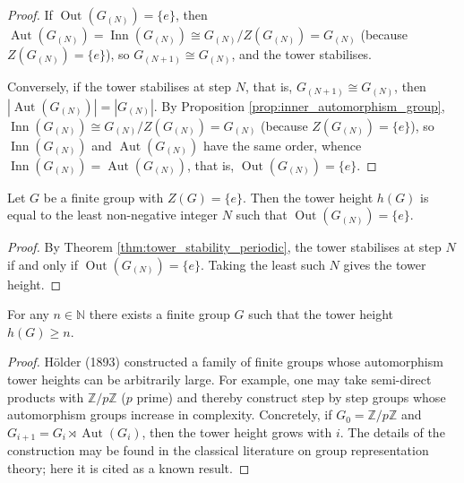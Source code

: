 \begin{proof}
If $\operatorname{Out}(G_{(N)}) = \{e\}$, then $\operatorname{Aut}(G_{(N)}) = \operatorname{Inn}(G_{(N)}) \cong G_{(N)}/Z(G_{(N)}) = G_{(N)}$ (because $Z(G_{(N)})=\{e\}$), so $G_{(N+1)} \cong G_{(N)}$, and the tower stabilises.

Conversely, if the tower stabilises at step $N$, that is, $G_{(N+1)} \cong G_{(N)}$, then $|\operatorname{Aut}(G_{(N)})| = |G_{(N)}|$. By Proposition \ref{prop:inner_automorphism_group}, $\operatorname{Inn}(G_{(N)}) \cong G_{(N)}/Z(G_{(N)}) = G_{(N)}$ (because $Z(G_{(N)})=\{e\}$), so $\operatorname{Inn}(G_{(N)})$ and $\operatorname{Aut}(G_{(N)})$ have the same order, whence $\operatorname{Inn}(G_{(N)}) = \operatorname{Aut}(G_{(N)})$, that is, $\operatorname{Out}(G_{(N)}) = \{e\}$.
\end{proof}

\begin{corollary}\label{cor:tower_height_criterion}
Let $G$ be a finite group with $Z(G)=\{e\}$. Then the tower height $h(G)$ is equal to the least non-negative integer $N$ such that $\operatorname{Out}(G_{(N)})=\{e\}$.
\end{corollary}

\begin{proof}
By Theorem \ref{thm:tower_stability_periodic}, the tower stabilises at step $N$ if and only if $\operatorname{Out}(G_{(N)})=\{e\}$. Taking the least such $N$ gives the tower height.
\end{proof}

\begin{theorem}\label{thm:holder_program}
For any $n\in\mathbb{N}$ there exists a finite group $G$ such that the tower height $h(G)\ge n$.
\end{theorem}

\begin{proof}
H\"older (1893) constructed a family of finite groups whose automorphism tower heights can be arbitrarily large. For example, one may take semi-direct products with $\mathbb{Z}/p\mathbb{Z}$ ($p$ prime) and thereby construct step by step groups whose automorphism groups increase in complexity. Concretely, if $G_0 = \mathbb{Z}/p\mathbb{Z}$ and $G_{i+1} = G_i \rtimes \operatorname{Aut}(G_i)$, then the tower height grows with $i$. The details of the construction may be found in the classical literature on group representation theory; here it is cited as a known result.
\end{proof}

